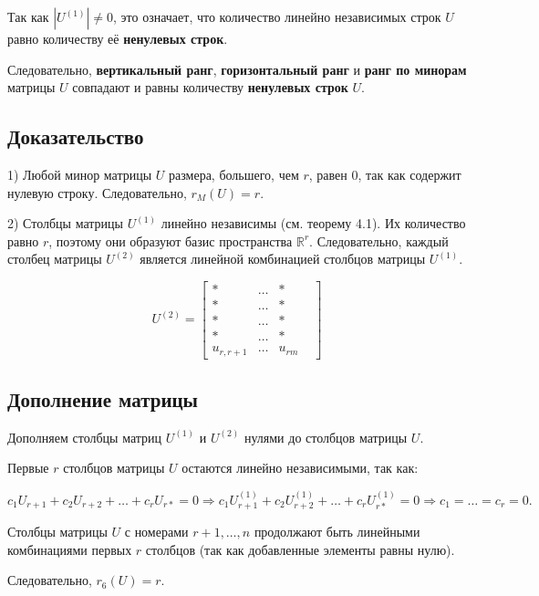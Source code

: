 {Так как \( |U^{(1)}| \neq 0 \), это означает, что количество линейно независимых строк \( U \) равно количеству её \textbf{ненулевых строк}. 

Следовательно, \textbf{вертикальный ранг}, \textbf{горизонтальный ранг} и \textbf{ранг по минорам} матрицы \( U \) совпадают и равны количеству \textbf{ненулевых строк} \( U \).







\subsection*{Доказательство}

1) Любой минор матрицы \( U \) размера, большего, чем \( r \), равен \( 0 \), так как содержит нулевую строку. Следовательно, \( r_M(U) = r \).

2) Столбцы матрицы \( U^{(1)} \) линейно независимы (см. теорему 4.1). Их количество равно \( r \), поэтому они образуют базис пространства \( \mathbb{R}^r \). Следовательно, каждый столбец матрицы \( U^{(2)} \) является линейной комбинацией столбцов матрицы \( U^{(1)} \).

\[
U^{(2)} =
\begin{bmatrix}
* & \dots & *  \\
* & \dots & *  \\
* & \dots & *  \\
* & \dots & * & \\
u_{r,r+1} & \dots & u_{rm} & 
\end{bmatrix}
\]

\subsection*{Дополнение матрицы}

Дополняем столбцы матриц \( U^{(1)} \) и \( U^{(2)} \) нулями до столбцов матрицы \( U \).

Первые \( r \) столбцов матрицы \( U \) остаются линейно независимыми, так как:

\[
c_1 U_{r+1} + c_2 U_{r+2} + \dots + c_r U_{r*} = 0 \Rightarrow c_1 U^{(1)}_{r+1} + c_2 U^{(1)}_{r+2} + \dots + c_r U^{(1)}_{r*} = 0 \Rightarrow c_1 = \dots = c_r = 0.
\]

Столбцы матрицы \( U \) с номерами \( r+1, \dots, n \) продолжают быть линейными комбинациями первых \( r \) столбцов (так как добавленные элементы равны нулю).

Следовательно, \( r_6(U) = r \).

}
